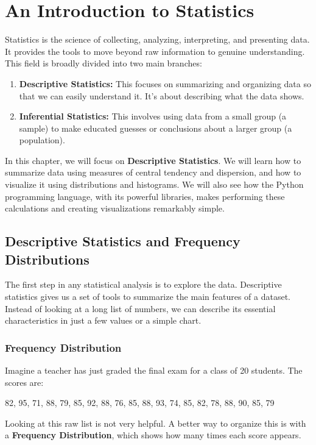 \chapter{An Introduction to Statistics}
\label{chap:ch6}

Statistics is the science of collecting, analyzing, interpreting, and presenting data. It provides the tools to move beyond raw information to genuine understanding. This field is broadly divided into two main branches:

\begin{enumerate}
    \item \textbf{Descriptive Statistics:} This focuses on summarizing and organizing data so that we can easily understand it. It's about describing what the data shows.
    \item \textbf{Inferential Statistics:} This involves using data from a small group (a sample) to make educated guesses or conclusions about a larger group (a population).
\end{enumerate}

In this chapter, we will focus on \textbf{Descriptive Statistics}. We will learn how to summarize data using measures of central tendency and dispersion, and how to visualize it using distributions and histograms. We will also see how the Python programming language, with its powerful libraries, makes performing these calculations and creating visualizations remarkably simple.

\section{Descriptive Statistics and Frequency Distributions}

The first step in any statistical analysis is to explore the data. Descriptive statistics gives us a set of tools to summarize the main features of a dataset. Instead of looking at a long list of numbers, we can describe its essential characteristics in just a few values or a simple chart.

\subsection{Frequency Distribution}
Imagine a teacher has just graded the final exam for a class of 20 students. The scores are:

82, 95, 71, 88, 79, 85, 92, 88, 76, 85, 88, 93, 74, 85, 82, 78, 88, 90, 85, 79

Looking at this raw list is not very helpful. A better way to organize this is with a \textbf{Frequency Distribution}, which shows how many times each score appears.

